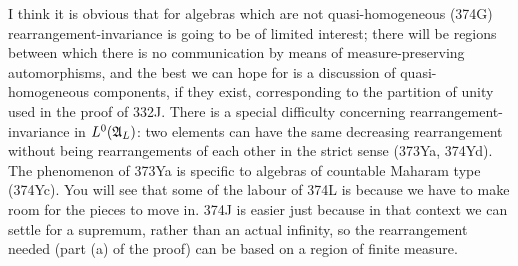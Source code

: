 {I think it is obvious that for algebras which are not
quasi-homogeneous (374G)
rearrange\discretionary{-}{}{}ment-{\vthsp}invariance is going to be
of limited interest;  there will be regions between which there is no
communication by means of
measure-preserving automorphisms, and the best we can hope for is a
discussion of quasi-homogeneous components, if they exist, corresponding
to the partition of unity used in the proof of 332J.
There is a special difficulty concerning
rearrangement-{\vthsp}invariance
in $L^0(\frak A_L)$:  two elements can have the same decreasing
rearrangement without being rearrangements of each other in the strict
sense (373Ya, 374Yd).   The phenomenon of 373Ya is specific to algebras
of countable Maharam type (374Yc).   You will see that some of the
labour of 374L is because we have to make room for the pieces to move
in.   374J is easier just because in that context we can settle for a
supremum, rather than
an actual infinity, so the rearrangement needed (part (a) of the proof)
can be based on a region of finite measure.
}%

\discrpage


